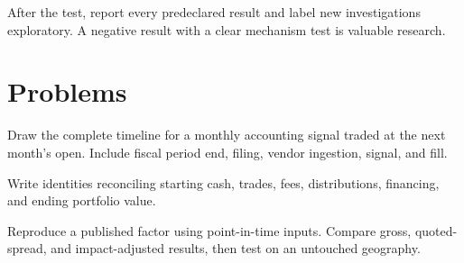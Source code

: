After the test, report every predeclared result and label new investigations
exploratory. A negative result with a clear mechanism test is valuable research.

\section{Problems}

\begin{exercise}
Draw the complete timeline for a monthly accounting signal traded at the next
month's open. Include fiscal period end, filing, vendor ingestion, signal, and fill.
\end{exercise}
\begin{exercise}
Write identities reconciling starting cash, trades, fees, distributions, financing,
and ending portfolio value.
\end{exercise}
\begin{exercise}[Research]
Reproduce a published factor using point-in-time inputs. Compare gross, quoted-spread,
and impact-adjusted results, then test on an untouched geography.
\end{exercise}

